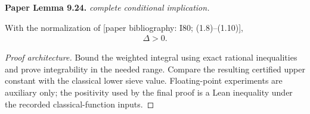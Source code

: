 \begin{lemma}
\label{sieve_positivity}
\leanok
\par\medskip\noindent\textbf{Paper Lemma 9.24.} \textit{complete conditional implication.}\par
With the normalization of \textnormal{[paper bibliography: I80; (1.8)--(1.10)]},
\begin{align}
 \Delta>0.
\end{align}
\end{lemma}
\begin{proof}[Proof architecture]
\leanok
Bound the weighted integral using exact rational inequalities and prove integrability in the needed range. Compare the resulting certified upper constant with the classical lower sieve value. Floating-point experiments are auxiliary only; the positivity used by the final proof is a Lean inequality under the recorded classical-function inputs.
\end{proof}


